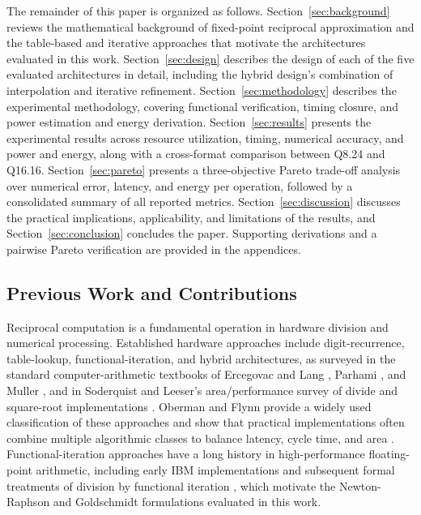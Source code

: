 \documentclass[manuscript,screen,review]{acmart}
\begin{document}
The remainder of this paper is organized as follows. Section~\ref{sec:background} reviews the mathematical background of fixed-point reciprocal approximation and the table-based and iterative approaches that motivate the architectures evaluated in this work. Section~\ref{sec:design} describes the design of each of the five evaluated architectures in detail, including the hybrid design's combination of interpolation and iterative refinement. Section~\ref{sec:methodology} describes the experimental methodology, covering functional verification, timing closure, and power estimation and energy derivation. Section~\ref{sec:results} presents the experimental results across resource utilization, timing, numerical accuracy, and power and energy, along with a cross-format comparison between Q8.24 and Q16.16. Section~\ref{sec:pareto} presents a three-objective Pareto trade-off analysis over numerical error, latency, and energy per operation, followed by a consolidated summary of all reported metrics. Section~\ref{sec:discussion} discusses the practical implications, applicability, and limitations of the results, and Section~\ref{sec:conclusion} concludes the paper. Supporting derivations and a pairwise Pareto verification are provided in the appendices.

\subsection{Previous Work and Contributions}

Reciprocal computation is a fundamental operation in hardware division and numerical processing. Established hardware approaches include digit-recurrence, table-lookup, functional-iteration, and hybrid architectures, as surveyed in the standard computer-arithmetic textbooks of Ercegovac and Lang \cite{ErcegovacLang94,ErcegovacLang04}, Parhami \cite{Parhami00}, and Muller \cite{Muller97}, and in Soderquist and Leeser's area/performance survey of divide and square-root implementations \cite{Soderquist96}. Oberman and Flynn provide a widely used classification of these approaches and show that practical implementations often combine multiple algorithmic classes to balance latency, cycle time, and area \cite{Oberman97}. Functional-iteration approaches have a long history in high-performance floating-point arithmetic, including early IBM implementations and subsequent formal treatments of division by functional iteration \cite{AndersonEarleGoldschmidtPowers67,Flynn70}, which motivate the Newton-Raphson and Goldschmidt formulations evaluated in this work.
\end{document}
